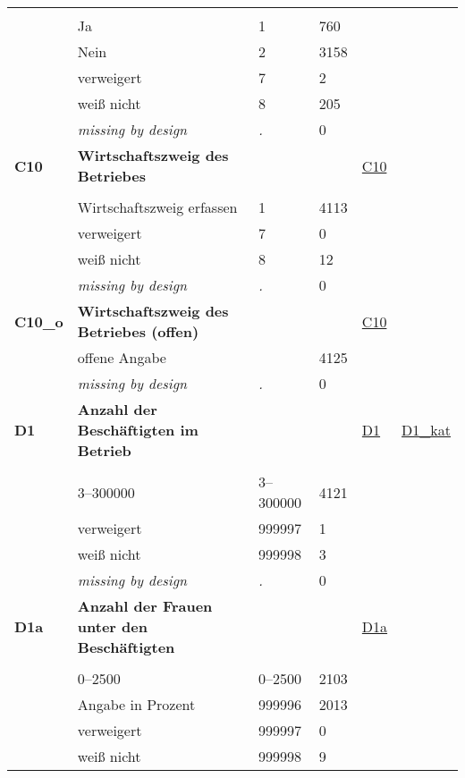 \begin{longtable}{| L{2.45cm} | L{6cm} | C{1.5cm} | R{1cm} | C{2.25cm} | C{2.25cm} |}
   &  &  &  &  &  \\ 
   & Ja & 1 & 760 &  &  \\ 
   & Nein & 2 & 3158 &  &  \\ 
   & verweigert & 7 & 2 &  &  \\ 
   & weiß nicht & 8 & 205 &  &  \\ 
   & \textit{missing by design} & \textit{.} & 0 &  &  \\ 
   \midrule
\textbf{C10}\label{var:C10} & \textbf{Wirtschaftszweig des Betriebes} &  &  & \hyperref[C10]{C10} & \hyperref[var:suf:]{} \\ 
   &  &  &  &  &  \\ 
   & Wirtschaftszweig erfassen & 1 & 4113 &  &  \\ 
   & verweigert & 7 & 0 &  &  \\ 
   & weiß nicht & 8 & 12 &  &  \\ 
   & \textit{missing by design} & \textit{.} & 0 &  &  \\ 
   \midrule
\textbf{C10\_o}\label{var:C10:o} & \textbf{Wirtschaftszweig des Betriebes (offen)} &  &  & \hyperref[C10]{C10} & \hyperref[var:suf:]{} \\ 
   & offene Angabe &  & 4125 &  &  \\ 
   & \textit{missing by design} & \textit{.} & 0 &  &  \\ 
   \midrule
\textbf{D1}\label{var:D1} & \textbf{Anzahl der Beschäftigten im Betrieb} &  &  & \hyperref[D1]{D1} & \hyperref[var:suf:D1:kat]{D1\_kat} \\ 
   &  &  &  &  &  \\ 
   & 3--300000 & 3--300000 & 4121 &  &  \\ 
   & verweigert & 999997 & 1 &  &  \\ 
   & weiß nicht & 999998 & 3 &  &  \\ 
   & \textit{missing by design} & \textit{.} & 0 &  &  \\ 
   \midrule
\textbf{D1a}\label{var:D1a} & \textbf{Anzahl der Frauen unter den Beschäftigten} &  &  & \hyperref[D1a]{D1a} & \hyperref[var:suf:]{} \\ 
   &  &  &  &  &  \\ 
   & 0--2500 & 0--2500 & 2103 &  &  \\ 
   & Angabe in Prozent & 999996 & 2013 &  &  \\ 
   & verweigert & 999997 & 0 &  &  \\ 
   & weiß nicht & 999998 & 9 &  &  \\ 

\end{longtable}

